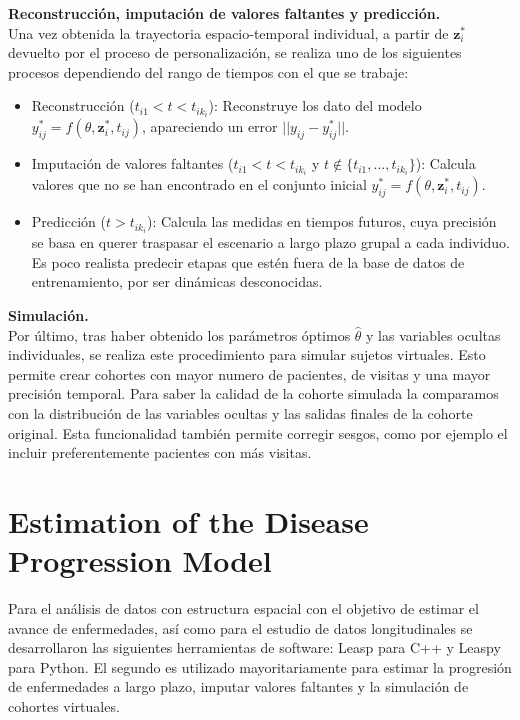 \begin{description}
		\item {\textbf{Reconstrucción, imputación de valores faltantes y predicción.}}\\
		Una vez obtenida la trayectoria espacio-temporal individual, a partir de $\mathbf{z}_{i}^{*}$ devuelto por el proceso de personalización, se realiza uno de los siguientes procesos dependiendo del rango de tiempos con el que se trabaje:
		\begin{itemize}
			\item Reconstrucción ($t_{i1}<t<t_{ik_{i}}$): Reconstruye los dato del modelo $y_{ij}^{*}=f(\theta, \mathbf{z}_{i}^{*}, t_{ij})$, apareciendo un error $||y_{ij}-y_{ij}^{*}||$.
			\item Imputación de valores faltantes ($t_{i1}<t<t_{ik_{i}}$ y $t \notin \{t_{i1},...,t_{ik_{i}}\}$): Calcula valores que no se han encontrado en el conjunto inicial $y_{ij}^{*}=f(\theta, \mathbf{z}_{i}^{*}, t_{ij})$.
			\item Predicción ($t>t_{ik_{i}}$): Calcula las medidas en tiempos futuros, cuya precisión se basa en querer traspasar el escenario a largo plazo grupal a cada individuo. Es poco realista predecir etapas que estén fuera de la base de datos de entrenamiento, por ser dinámicas desconocidas.
		\end{itemize}
		
		\item {\textbf{Simulación.}}\\
		Por último, tras haber obtenido los parámetros óptimos $\hat{\theta}$ y las variables ocultas individuales, se realiza este procedimiento para simular sujetos virtuales. Esto permite crear cohortes con mayor numero de pacientes, de visitas y una mayor precisión temporal. Para saber la calidad de la cohorte simulada la comparamos con la distribución de las variables ocultas y las salidas finales de la cohorte original. Esta funcionalidad también permite corregir sesgos, como por ejemplo el incluir preferentemente pacientes con más visitas. 
	\end{description}
	
	
	
	\section{Estimation of the Disease Progression Model}
	
	Para el análisis de datos con estructura espacial con el objetivo de estimar el
	avance de enfermedades, así como para el estudio de datos longitudinales se
	desarrollaron las siguientes herramientas de software: Leasp para C++ y Leaspy
	para Python. El segundo es utilizado mayoritariamente para estimar la progresión
	de enfermedades a largo plazo, imputar valores faltantes y la simulación de
	cohortes virtuales.\cite[Capítulo 7]{koval2020learning}
	
